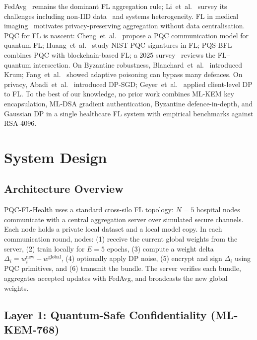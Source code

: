 \documentclass[conference]{IEEEtran}
\begin{document}
FedAvg~\cite{mcmahan2017} remains the dominant FL aggregation rule;
Li~et~al.~\cite{li2020federated} survey its challenges including
non-IID data~\cite{zhao2018} and systems heterogeneity.
FL in medical imaging~\cite{rieke2020} motivates privacy-preserving
aggregation without data centralisation.
PQC for FL is nascent: Cheng~et~al.~\cite{cheng2023pqcfl} propose a
PQC communication model for quantum FL;
Huang~et~al.~\cite{huang2024pqcfl} study NIST PQC signatures in FL;
PQS-BFL~\cite{pierson2025pqsbfl} combines PQC with blockchain-based FL;
a 2025 survey~\cite{survey2025flquantum} reviews the FL--quantum
intersection.
On Byzantine robustness, Blanchard~et~al.~\cite{blanchard2017}
introduced Krum; Fang~et~al.~\cite{fang2020} showed adaptive
poisoning can bypass many defences.
On privacy, Abadi~et~al.~\cite{abadi2016} introduced DP-SGD;
Geyer~et~al.~\cite{geyer2017} applied client-level DP to FL.
To the best of our knowledge, no prior work combines ML-KEM key
encapsulation, ML-DSA gradient authentication, Byzantine
defence-in-depth, and Gaussian DP in a single healthcare FL system
with empirical benchmarks against RSA-4096.

\section{System Design}
\label{sec:system}

\subsection{Architecture Overview}

PQC-FL-Health uses a standard cross-silo FL topology: $N = 5$
hospital nodes communicate with a central aggregation server over
simulated secure channels.
Each node holds a private local dataset and a local model copy.
In each communication round, nodes: (1) receive the current global
weights from the server, (2) train locally for $E = 5$ epochs,
(3) compute a weight delta $\Delta_i = w_i^{\text{new}} - w^{\text{global}}$,
(4) optionally apply DP noise, (5) encrypt and sign $\Delta_i$ using
PQC primitives, and (6) transmit the bundle.
The server verifies each bundle, aggregates accepted updates with
FedAvg, and broadcasts the new global weights.

\subsection{Layer 1: Quantum-Safe Confidentiality (ML-KEM-768)}
\end{document}
